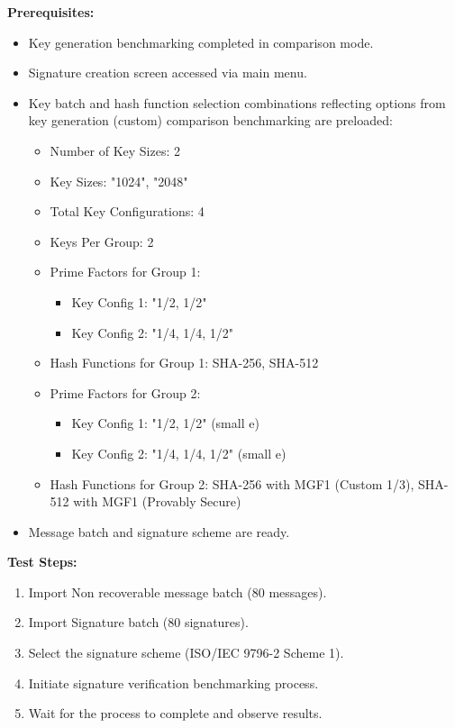 \documentclass[]{final_report}
\theoremstyle{definition}
\begin{document}
\textbf{Prerequisites:}
\begin{itemize}
    \item Key generation benchmarking completed in comparison mode.
    \item Signature creation screen accessed via main menu.
    \item Key batch and hash function selection combinations  reflecting options from key generation (custom) comparison benchmarking are preloaded:
    \begin{itemize}
           \item Number of Key Sizes: 2
    \item Key Sizes: "1024", "2048"
    \item Total Key Configurations: 4
    \item Keys Per Group: 2
    \item Prime Factors for Group 1: 
        \begin{itemize}
            \item Key Config 1: "1/2, 1/2"
            \item Key Config 2: "1/4, 1/4, 1/2"
        \end{itemize}
    \item Hash Functions for Group 1: SHA-256, SHA-512
    \item Prime Factors for Group 2: 
        \begin{itemize}
            \item Key Config 1: "1/2, 1/2" (small e)
            \item Key Config 2: "1/4, 1/4, 1/2" (small e)
        \end{itemize}
    \item Hash Functions for Group 2: SHA-256 with MGF1 (Custom 1/3), SHA-512 with MGF1 (Provably Secure)
        \end{itemize}
    \item Message batch and signature scheme are ready.
\end{itemize}

\textbf{Test Steps:}
\begin{enumerate}
    \item Import Non recoverable message batch (80 messages).
     \item Import Signature batch (80 signatures).
    \item Select the signature scheme (ISO/IEC 9796-2 Scheme 1).
    \item Initiate signature verification benchmarking process.
    \item Wait for the process to complete and observe results.
\end{enumerate}
\end{document}

